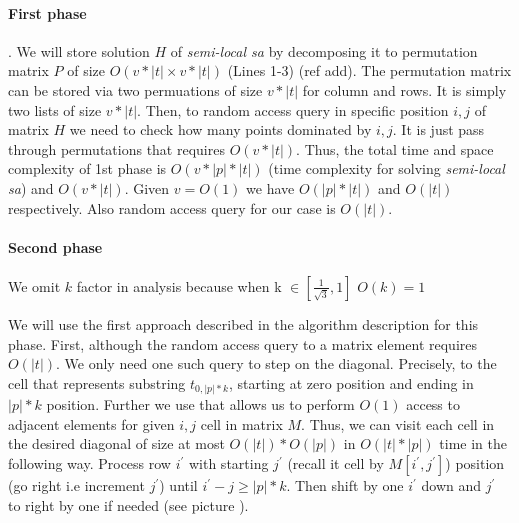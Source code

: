 \paragraph{First phase}.
We will store solution $H$ of \emph{semi-local sa} by decomposing it to permutation matrix $P$ of size $O(v*|t|\times v*|t|)$ (Lines 1-3) (ref add).
The permutation matrix can be stored via two permuations of size $v*|t|$ for column and rows.
It is simply two lists of size $v*|t|$.
Then, to random access query in specific position $i,j$ of matrix $H$ we need to check how many points dominated by $i,j$.
It is just pass through permutations that requires $O(v*|t|)$.
Thus, the total time and space complexity of 1st phase is $O(v *|p| * |t|)$ (time complexity for solving \emph{semi-local sa}) and $O(v*|t|)$.
Given $v=O(1)$ we have $O(|p| * |t|)$ and $O(|t|)$ respectively.
Also random access query for our case is $O(|t|)$.

  





\paragraph{Second phase}
We omit $k$ factor in analysis because when k $\in [\frac{1}{\sqrt{3}},1]$ $O(k) = 1$

We will use the first approach described in the algorithm description for this phase.
First, although the random access query to a matrix element requires $O(|t|)$.
We only need one such query to step on the diagonal.
Precisely, to the cell that represents substring $t_{0,|p|*k}$, starting at zero position and ending in $|p|*k$ position.  
Further we use  that allows us to perform $O(1)$ access to adjacent elements for given $i,j$ cell in matrix $M$.
Thus, we can visit each cell in the desired diagonal of size at most $O(|t|) * O(|p|) $ in $O(|t|*|p|)$ time in the following way.
Process row $i^{'}$ with starting $j^{'}$ (recall it cell by $M[i^{'},j^{'}]$) position  (go right i.e increment $j^{'}$) until $i^{'}-j \geq |p|*k$.
Then shift by one $i^{'}$ down and $j^{'}$ to right by one if needed (see picture ).

